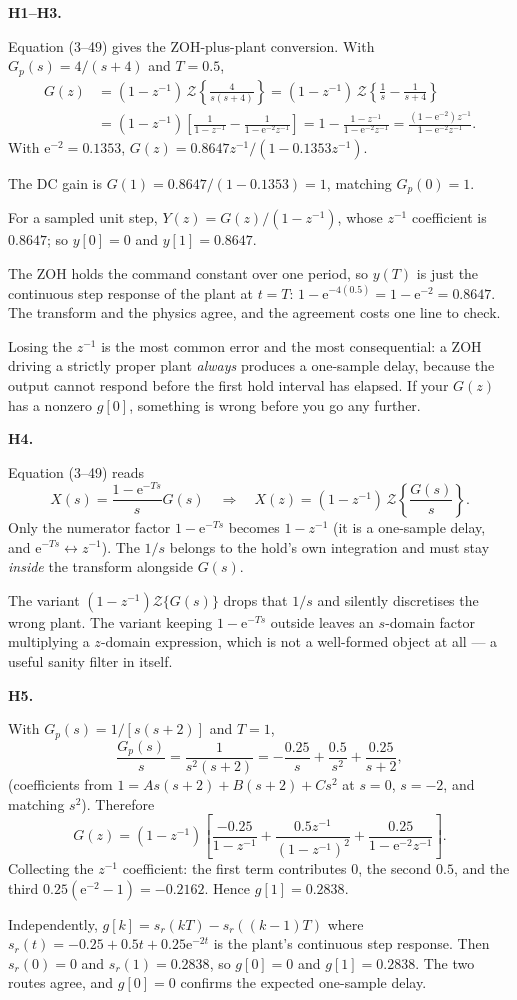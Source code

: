 \documentclass[10pt]{article}
\newcommand{\Z}{\mathcal{Z}}
\newcommand{\e}{\mathrm{e}}
\newcommand{\src}[1]{{\small\color{gray}[PDF pp.~#1]}}
\newcommand{\itemhead}[2]{\par\medskip\noindent\textbf{#1}\quad\src{#2}\par\nopagebreak}
\newcommand{\verify}[1]{\par\smallskip\noindent{\color{blue!55!black}\textbf{Check.}} #1\par}
\newcommand{\wrong}[1]{\par\smallskip\noindent{\color{red!55!black}\textbf{If you missed it.}} #1\par}
\begin{document}
\itemhead{H1--H3.}{111--115}
Equation (3--49) gives the ZOH-plus-plant conversion. With
\(G_{p}(s)=4/(s+4)\) and \(T=0.5\),
\begin{align*}
G(z)&=(1-z^{-1})\,\Z\!\left\{\frac{4}{s(s+4)}\right\}
     =(1-z^{-1})\,\Z\!\left\{\frac{1}{s}-\frac{1}{s+4}\right\}\\
    &=(1-z^{-1})\left[\frac{1}{1-z^{-1}}-\frac{1}{1-\e^{-2}z^{-1}}\right]
     =1-\frac{1-z^{-1}}{1-\e^{-2}z^{-1}}
     =\frac{(1-\e^{-2})z^{-1}}{1-\e^{-2}z^{-1}} .
\end{align*}
With \(\e^{-2}=0.1353\), \(G(z)=0.8647z^{-1}/(1-0.1353z^{-1})\).

The DC gain is \(G(1)=0.8647/(1-0.1353)=1\), matching \(G_{p}(0)=1\).

For a sampled unit step, \(Y(z)=G(z)/(1-z^{-1})\), whose \(z^{-1}\) coefficient is
\(0.8647\); so \(y[0]=0\) and \(y[1]=0.8647\).
\verify{The ZOH holds the command constant over one period, so \(y(T)\) is just the
continuous step response of the plant at \(t=T\): \(1-\e^{-4(0.5)}=1-\e^{-2}=0.8647\).
The transform and the physics agree, and the agreement costs one line to check.}
\wrong{Losing the \(z^{-1}\) is the most common error and the most consequential:
a ZOH driving a strictly proper plant \emph{always} produces a one-sample delay,
because the output cannot respond before the first hold interval has elapsed. If
your \(G(z)\) has a nonzero \(g[0]\), something is wrong before you go any further.}

\itemhead{H4.}{113--114}
Equation (3--49) reads
\[
X(s)=\frac{1-\e^{-Ts}}{s}G(s)
\quad\Longrightarrow\quad
X(z)=(1-z^{-1})\,\Z\!\left\{\frac{G(s)}{s}\right\}.
\]
Only the numerator factor \(1-\e^{-Ts}\) becomes \(1-z^{-1}\) (it is a one-sample
delay, and \(\e^{-Ts}\leftrightarrow z^{-1}\)). The \(1/s\) belongs to the hold's own
integration and must stay \emph{inside} the transform alongside \(G(s)\).
\wrong{The variant \((1-z^{-1})\Z\{G(s)\}\) drops that \(1/s\) and silently
discretises the wrong plant. The variant keeping \(1-\e^{-Ts}\) outside leaves an
\(s\)-domain factor multiplying a \(z\)-domain expression, which is not a
well-formed object at all --- a useful sanity filter in itself.}

\itemhead{H5.}{113--115}
With \(G_{p}(s)=1/[s(s+2)]\) and \(T=1\),
\[
\frac{G_{p}(s)}{s}=\frac{1}{s^{2}(s+2)}
=-\frac{0.25}{s}+\frac{0.5}{s^{2}}+\frac{0.25}{s+2},
\]
(coefficients from \(1=As(s+2)+B(s+2)+Cs^{2}\) at \(s=0\), \(s=-2\), and matching
\(s^{2}\)). Therefore
\[
G(z)=(1-z^{-1})\left[\frac{-0.25}{1-z^{-1}}
+\frac{0.5z^{-1}}{(1-z^{-1})^{2}}
+\frac{0.25}{1-\e^{-2}z^{-1}}\right].
\]
Collecting the \(z^{-1}\) coefficient: the first term contributes 0, the second
\(0.5\), and the third \(0.25(\e^{-2}-1)=-0.2162\). Hence \(g[1]=0.2838\).
\verify{Independently, \(g[k]=s_{r}(kT)-s_{r}((k-1)T)\) where
\(s_{r}(t)=-0.25+0.5t+0.25\e^{-2t}\) is the plant's continuous step response. Then
\(s_{r}(0)=0\) and \(s_{r}(1)=0.2838\), so \(g[0]=0\) and \(g[1]=0.2838\). The two
routes agree, and \(g[0]=0\) confirms the expected one-sample delay.}
\end{document}
